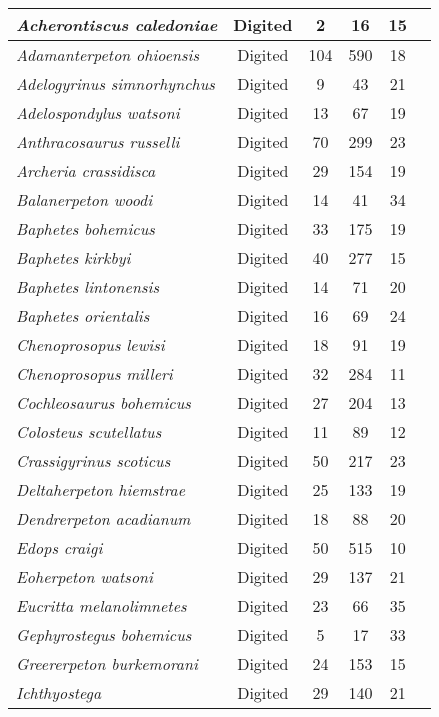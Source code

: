 \begin{tabular}{|L{4.5cm}|c|c|c|c|L{4.5cm}|}
\textit{Acherontiscus caledoniae}&Digited&2&16&15&\cite{Carr69a}\\\hline
\textit{Adamanterpeton ohioensis}&Digited&104&590&18&\cite{Miln98a}\\\hline
\textit{Adelogyrinus simnorhynchus}&Digited&9&43&21&\cite{Brou67b}\\\hline
\textit{Adelospondylus watsoni}&Digited&13&67&19&\cite{Carr67a}\\\hline
\textit{Anthracosaurus russelli}&Digited&70&299&23&\cite{Panc77a}\\\hline
\textit{Archeria crassidisca}&Digited&29&154&19&\cite{Clac12a}\\\hline
\textit{Balanerpeton woodi}&Digited&14&41&34&\cite{Miln94a}\\\hline
\textit{Baphetes bohemicus}&Digited&33&175&19&\cite{Beau77a}\\\hline
\textit{Baphetes kirkbyi}&Digited&40&277&15&\cite{Beau77a}\\\hline
\textit{Baphetes lintonensis}&Digited&14&71&20&\cite{Beau77a}\\\hline
\textit{Baphetes orientalis}&Digited&16&69&24&\cite{Miln09a}\\\hline
\textit{Chenoprosopus lewisi}&Digited&18&91&19&\cite{Hook93a}\\\hline
\textit{Chenoprosopus milleri}&Digited&32&284&11&\cite{Case13a}\\\hline
\textit{Cochleosaurus bohemicus}&Digited&27&204&13&\cite{Sequ03a}\\\hline
\textit{Colosteus scutellatus}&Digited&11&89&12&\cite{Hook83a}\\\hline
\textit{Crassigyrinus scoticus}&Digited&50&217&23&\cite{Panc85a}\\\hline
\textit{Deltaherpeton hiemstrae}&Digited&25&133&19&\cite{Bolt10a}\\\hline
\textit{Dendrerpeton acadianum}&Digited&18&88&20&\cite{Holm98a}\\\hline
\textit{Edops craigi}&Digited&50&515&10&\cite{Rome42a}\\\hline
\textit{Eoherpeton watsoni}&Digited&29&137&21&\cite{Smit85a}\\\hline
\textit{Eucritta melanolimnetes}&Digited&23&66&35&\cite{Clac98a}\\\hline
\textit{Gephyrostegus bohemicus}&Digited&5&17&33&\cite{Brou67a}\\\hline
\textit{Greererpeton burkemorani}&Digited&24&153&15&\cite{Bent90a}\\\hline
\textit{Ichthyostega}&Digited&29&140&21&\cite{Bent90a}\\\hline

\end{tabular}
